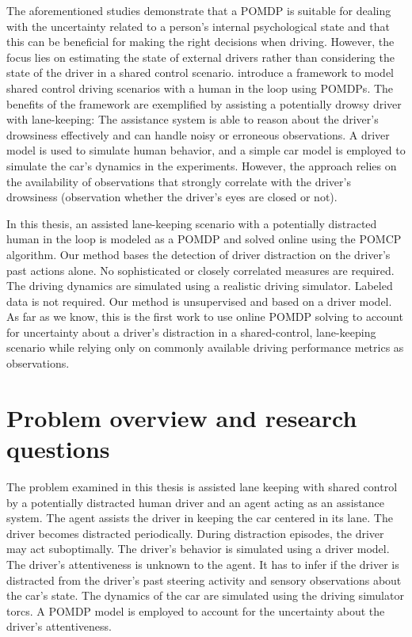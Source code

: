 The aforementioned studies demonstrate that a POMDP is suitable for dealing with the uncertainty related to a person's internal psychological state and that this can be beneficial for making the right decisions when driving. However, the focus lies on estimating the state of external drivers rather than considering the state of the driver in a shared control scenario. \cite{hitl_pomdp} introduce a framework to model shared control driving scenarios with a human in the loop using POMDPs. The benefits of the framework are exemplified by assisting a potentially drowsy driver with lane-keeping: The assistance system is able to reason about the driver's drowsiness effectively and can handle noisy or erroneous observations. A driver model is used to simulate human behavior, and a simple car model is employed to simulate the car's dynamics in the experiments. However, the approach relies on the availability of observations that strongly correlate with the driver's drowsiness (observation whether the driver's eyes are closed or not).

In this thesis, an assisted lane-keeping scenario with a potentially distracted human in the loop is modeled as a POMDP and solved online using the POMCP algorithm. Our method bases the detection of driver distraction on the driver's past actions alone. No sophisticated or closely correlated measures are required. The driving dynamics are simulated using a realistic driving simulator. Labeled data is not required. Our method is unsupervised and based on a driver model. As far as we know, this is the first work to use online POMDP solving to account for uncertainty about a driver's distraction in a shared-control, lane-keeping scenario while relying only on commonly available driving performance metrics as observations.

\section{Problem overview and research questions}

The problem examined in this thesis is assisted lane keeping with shared control by a potentially distracted human driver and an agent acting as an assistance system. The agent assists the driver in keeping the car centered in its lane. The driver becomes distracted periodically. During distraction episodes, the driver may act suboptimally. The driver's behavior is simulated using a driver model. The driver’s attentiveness is unknown to the agent. It has to infer if the driver is distracted from the driver's past steering activity and sensory observations about the car's state. The dynamics of the car are simulated using the driving simulator \Gls{torcs}. A POMDP model is employed to account for the uncertainty about the driver's attentiveness.

